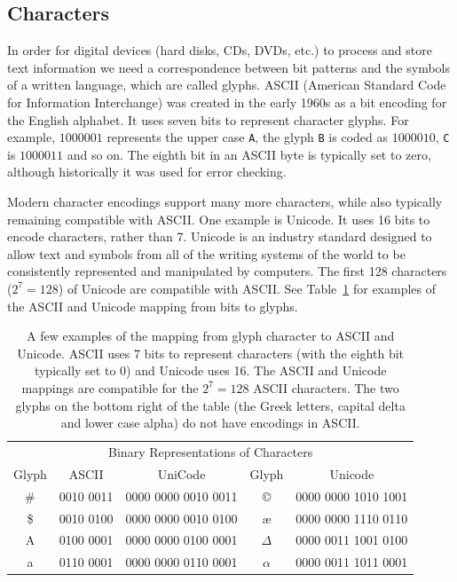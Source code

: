 \subsection{Characters}\label{sec:characters}
In order for digital devices (hard disks, CDs, DVDs, etc.) to process
and store text information we need a correspondence between bit
patterns and the symbols of a written language, which are called
glyphs.  ASCII (American Standard Code for Information Interchange)
was created in the early 1960s as a bit encoding for the English
alphabet. It uses seven bits to represent character glyphs.  For
example, $1000001$ represents the upper case \verb+A+, the glyph
\verb+B+ is coded as $1000010$, \verb+C+ is $1000011$ and so on.  The
eighth bit in an ASCII byte is typically set to zero, although
historically it was used for error checking.

Modern character encodings support many more characters, while also
typically remaining compatible with ASCII.  One example is Unicode.
It uses 16 bits to encode characters, rather than 7.  Unicode is an
industry standard designed to allow text and symbols from all of the
writing systems of the world to be consistently represented and
manipulated by computers.  The first 128 characters ($2^7= 128$) of
Unicode are compatible with ASCII.  See Table~\ref{tab:ASCII} for
examples of the ASCII and Unicode mapping from bits to glyphs.

\begin{table}
\begin{center}
\begin{tabular}{ccc|cc}
  \multicolumn{5}{c}{Binary Representations of Characters}  \\
Glyph & ASCII & UniCode & Glyph & Unicode \\
\hline
\# & 0010 0011 & 0000 0000 0010 0011 & \copyright & 0000 0000 1010 1001 \\
\$ & 0010 0100 & 0000 0000 0010 0100 & \ae  & 0000 0000 1110 0110 \\
A & 0100 0001 & 0000 0000 0100 0001 & $\Delta$ & 0000 0011 1001 0100\\
a & 0110 0001 & 0000 0000 0110 0001 & $\alpha$ & 0000 0011 1011 0001\\
\hline
\end{tabular}
\caption{A few examples of the mapping from glyph character to ASCII
  and Unicode.  ASCII uses 7 bits to represent characters (with the
  eighth bit typically set to 0) and Unicode uses 16. The ASCII and
  Unicode mappings are compatible for the $2^7 = 128$ ASCII
  characters.  The two glyphs on the bottom right of the table (the
  Greek letters, capital delta and lower case alpha) do not have
  encodings in ASCII. }
\label{tab:ASCII}
\end{center}
\end{table}


